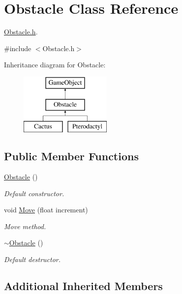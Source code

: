 \hypertarget{class_obstacle}{}\section{Obstacle Class Reference}
\label{class_obstacle}


\mbox{\hyperlink{_obstacle_8h}{Obstacle.\+h}}.  




{\ttfamily \#include $<$Obstacle.\+h$>$}

Inheritance diagram for Obstacle\+:\begin{figure}[H]
\begin{center}
\leavevmode
\includegraphics[height=3.000000cm]{class_obstacle}
\end{center}
\end{figure}
\subsection*{Public Member Functions}
\begin{DoxyCompactItemize}
\item 
\mbox{\hyperlink{class_obstacle_a8f734072321fa06a7b7dae2d5f50f352}{Obstacle}} ()
\begin{DoxyCompactList}\small\item\em Default constructor. \end{DoxyCompactList}\item 
void \mbox{\hyperlink{class_obstacle_af06377faeba537b4ff98ee2cfa061831}{Move}} (float increment)
\begin{DoxyCompactList}\small\item\em Move method. \end{DoxyCompactList}\item 
\mbox{\hyperlink{class_obstacle_af2f9cc9c6cff75dca0974fd5ac4f71a9}{$\sim$\+Obstacle}} ()
\begin{DoxyCompactList}\small\item\em Default destructor. \end{DoxyCompactList}\end{DoxyCompactItemize}
\subsection*{Additional Inherited Members}


